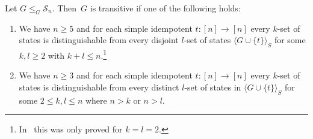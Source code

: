\begin{lemma} \label{lem:fivetrans} \label{lem:threetrans}
	Let $G \le_G \mathcal S_n$.	Then~$G$ is transitive if one of the following holds:
	
	\begin{enumerate}
	\item \label{lem:fivetrans:1}  We have $n \ge 5$ and for each 
	simple idempotent $t \colon [n] \to [n]$ every $k$-set of states
	is distinguishable from every disjoint $l$-set of states
	$\langle G \cup \{t\}\rangle_S$
	for some $k,l \ge 2$ with $k + l \le n$.\footnote{In~\cite{HoffmannLATAextended2} this was only proved for $k = l = 2$.}
	
	\item \label{lem:fivetrans:2}  We have $n \ge 3$
	and for each 
	simple idempotent $t \colon [n] \to [n]$  
	every $k$-set of states is distinguishable from every distinct $l$-set of states
	in $\langle G \cup \{t\}\rangle_S$
	for some $2 \le k, l \le n$ where $n > k$ or $n > l$.
	\end{enumerate}
\end{lemma}
